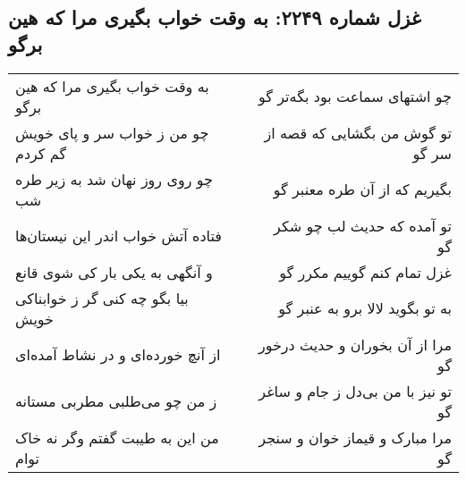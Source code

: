 \begin{center}
\section*{غزل شماره ۲۲۴۹: به وقت خواب بگیری مرا که هین برگو}
\label{sec:2249}
\begin{longtable}{l p{0.5cm} r}
به وقت خواب بگیری مرا که هین برگو
&&
چو اشتهای سماعت بود بگه‌تر گو
\\
چو من ز خواب سر و پای خویش گم کردم
&&
تو گوش من بگشایی که قصه از سر گو
\\
چو روی روز نهان شد به زیر طره شب
&&
بگیریم که از آن طره معنبر گو
\\
فتاده آتش خواب اندر این نیستان‌ها
&&
تو آمده که حدیث لب چو شکر گو
\\
و آنگهی به یکی بار کی شوی قانع
&&
غزل تمام کنم گوییم مکرر گو
\\
بیا بگو چه کنی گر ز خوابناکی خویش
&&
به تو بگوید لالا برو به عنبر گو
\\
از آنچ خورده‌ای و در نشاط آمده‌ای
&&
مرا از آن بخوران و حدیث درخور گو
\\
ز من چو می‌طلبی مطربی مستانه
&&
تو نیز با من بی‌دل ز جام و ساغر گو
\\
من این به طیبت گفتم وگر نه خاک توام
&&
مرا مبارک و قیماز خوان و سنجر گو
\\
\end{longtable}
\end{center}

